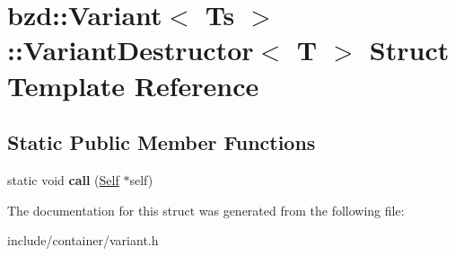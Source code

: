 \hypertarget{structbzd_1_1Variant_1_1VariantDestructor}{}\section{bzd\+:\+:Variant$<$ Ts $>$\+:\+:Variant\+Destructor$<$ T $>$ Struct Template Reference}
\label{structbzd_1_1Variant_1_1VariantDestructor}
\subsection*{Static Public Member Functions}
\begin{DoxyCompactItemize}
\item 
\mbox{\label{structbzd_1_1Variant_1_1VariantDestructor_ac4e3ae0f48ce469fa6834ed3710210df}} 
static void {\bfseries call} (\hyperlink{classbzd_1_1Variant}{Self} $\ast$self)
\end{DoxyCompactItemize}


The documentation for this struct was generated from the following file\+:\begin{DoxyCompactItemize}
\item 
include/container/variant.\+h\end{DoxyCompactItemize}
